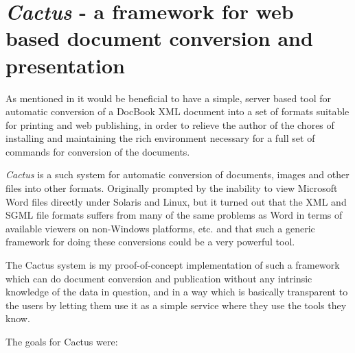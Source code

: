 %
%


\chapter{\textit{Cactus} - a framework for web based document
  conversion and presentation}

\label{cha:cactus}

As mentioned in
it would be beneficial to have a simple, server based tool for
automatic conversion of a DocBook XML document into a set of formats
suitable for printing and web publishing, in order to relieve the
author of the chores of installing and maintaining the rich
environment necessary for a full set of commands for conversion of
the documents.

\textit{Cactus} is a such system for automatic conversion of
documents, images and other files into other formats.  Originally
prompted by the inability to view Microsoft Word files directly under
Solaris and Linux, but it turned out that the XML and SGML file
formats suffers from many of the same problems as Word in terms of
available viewers on non-Windows platforms, etc.  and that such a
generic framework for doing these conversions could be a very powerful
tool.

The Cactus system is my proof-of-concept implementation of such a
framework which can do document conversion and publication without any
intrinsic knowledge of the data in question, and in a way which is
basically transparent to the users by letting them use it as a simple
service where they use the tools they know.


The goals for Cactus were:

